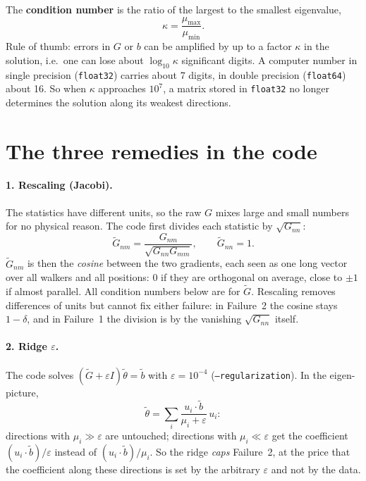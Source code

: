 \documentclass[11pt,a4paper]{article}
\newcommand{\code}[1]{\texttt{#1}}
\newcommand{\Gt}{\widetilde{G}}
\begin{document}
The \textbf{condition number} is the ratio of the largest to the smallest eigenvalue,
\[
  \kappa=\frac{\mu_{\max}}{\mu_{\min}} .
\]
Rule of thumb: errors in $G$ or $b$ can be amplified by up to a factor $\kappa$ in the solution,
i.e.\ one can lose about $\log_{10}\kappa$ significant digits. A computer number in single precision
(\code{float32}) carries about 7 digits, in double precision (\code{float64}) about 16. So when
$\kappa$ approaches $10^7$, a matrix stored in \code{float32} no longer determines the solution
along its weakest directions.

\section{The three remedies in the code}\label{sec:remedies}

\paragraph{1. Rescaling (Jacobi).} The statistics have different units, so the raw $G$ mixes large and
small numbers for no physical reason. The code first divides each statistic by $\sqrt{G_{nn}}$:
\[
  \Gt_{nm}=\frac{G_{nm}}{\sqrt{G_{nn}G_{mm}}},\qquad \Gt_{nn}=1 .
\]
$\Gt_{nm}$ is then the \emph{cosine} between the two gradients, each seen as one long vector over all
walkers and all positions: $0$ if they are orthogonal on average, close to $\pm1$ if almost parallel. All condition numbers below are for $\Gt$. Rescaling
removes differences of units but cannot fix either failure: in Failure~2 the cosine stays
$1-\delta$, and in Failure~1 the division is by the vanishing $\sqrt{G_{nn}}$ itself.

\paragraph{2. Ridge $\varepsilon$.} The code solves $(\Gt+\varepsilon I)\tilde\theta=\tilde b$ with
$\varepsilon=10^{-4}$ (\code{--regularization}). In the eigen-picture,
\[
  \tilde\theta=\sum_i\frac{u_i\cdot\tilde b}{\mu_i+\varepsilon}\,u_i :
\]
directions with $\mu_i\gg\varepsilon$ are untouched; directions with $\mu_i\ll\varepsilon$ get the
coefficient $(u_i\cdot\tilde b)/\varepsilon$ instead of $(u_i\cdot\tilde b)/\mu_i$. So the ridge
\emph{caps} Failure~2, at the price that the coefficient along these directions is set by the
arbitrary $\varepsilon$ and not by the data.
\end{document}
